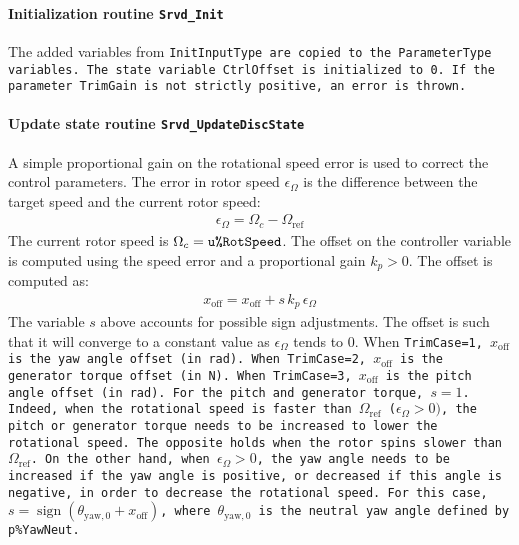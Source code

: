 \documentclass[11pt]{article}
\providecommand{\DIFaddbegin}{} %
\providecommand{\DIFaddend}{} %
\providecommand{\DIFdelbegin}{} %
\providecommand{\DIFdelend}{} %
\begin{document}
\paragraph{Initialization routine \tt{Srvd\_Init}}
The added variables from \tt{InitInputType} are copied to the \tt{ParameterType} variables.
The state variable \tt{CtrlOffset} is initialized to 0.
If the parameter \DIFdelbegin %
\DIFdelend \DIFaddbegin \tt{TrimGain} \DIFaddend is not strictly positive, an error is thrown.


\paragraph{Update state routine \tt{Srvd\_UpdateDiscState}}
A simple proportional gain on the rotational speed error is used to correct the control parameters.
The error in rotor speed $\epsilon_\Omega$ is the difference between the target speed and the current rotor speed:
        \begin{align}
            \epsilon_\Omega ={\Omega_c - \Omega_\text{ref}}
        \end{align}
The current rotor speed is $\Omega_c=\tt{u\%RotSpeed}$.
        The offset on the controller variable is computed using 
        the speed error and a proportional gain $k_p>0$. The offset is computed as:
        \begin{align}
            x_\text{off} = x_\text{off} + s\, k_p\, \epsilon_\Omega \label{eq:xoffpitch}
        \end{align}
The variable $s$ above accounts for possible sign adjustments. 
The offset is such that it will converge to a constant value as $\epsilon_\Omega$ tends to 0.
When \tt{TrimCase}=1, $x_\text{off}$ is the yaw angle offset (in rad). 
When \tt{TrimCase}=2, $x_\text{off}$ is the generator torque offset (in N). 
When \tt{TrimCase}=3, $x_\text{off}$ is the pitch angle offset (in rad). 
For the pitch and generator torque, $s=1$. Indeed, when the rotational speed is faster than $\Omega_\text{ref}$ ($\epsilon_\Omega>0)$, the  pitch or generator torque needs to be increased to lower the rotational speed. The opposite holds when the rotor spins slower than $\Omega_\text{ref}$.
On the other hand, when $\epsilon_\Omega>0$, the yaw angle needs to be increased if the yaw angle is positive, or decreased if this angle is negative, in order to decrease the rotational speed. For this case, $s=\operatorname{sign}( \theta_{\text{yaw},0}+x_\text{off})$, where $\theta_{\text{yaw},0}$ is the neutral yaw angle defined by \tt{p\%YawNeut}.
\end{document}
